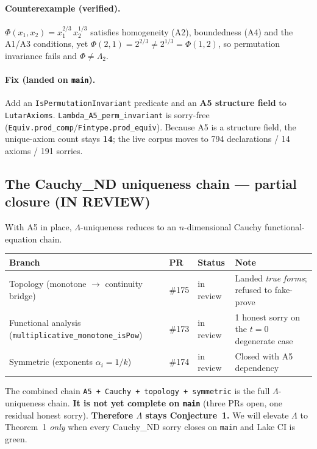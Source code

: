 \documentclass[11pt]{article}
\newcommand{\Lam}{\ensuremath{\Lambda}}
\begin{document}
\paragraph{Counterexample (verified).} $\Phi(x_1,x_2)=x_1^{2/3}\,x_2^{1/3}$ satisfies homogeneity (A2),
boundedness (A4) and the A1/A3 conditions, yet $\Phi(2,1)=2^{2/3}\neq 2^{1/3}=\Phi(1,2)$, so
permutation invariance fails and $\Phi\neq\Lambda_2$.

\paragraph{Fix (landed on \texttt{main}).} Add an \texttt{IsPermutationInvariant} predicate and an
\textbf{A5 structure field} to \texttt{LutarAxioms}. \texttt{Lambda\_A5\_perm\_invariant} is sorry-free
(\texttt{Equiv.prod\_comp}/\texttt{Fintype.prod\_equiv}). Because A5 is a structure field, the
unique-axiom count stays \textbf{14}; the live corpus moves to 794 declarations / 14 axioms / 191 sorries.

\subsection{The Cauchy\_ND uniqueness chain --- partial closure (IN REVIEW)}
With A5 in place, \Lam-uniqueness reduces to an $n$-dimensional Cauchy functional-equation chain.

\begin{center}\small
\begin{tabular}{@{}llll@{}}
\toprule
Branch & PR & Status & Note \\
\midrule
Topology (monotone $\to$ continuity bridge) & \#175 & in review & Landed \emph{true forms}; refused to fake-prove \\
Functional analysis (\texttt{multiplicative\_monotone\_isPow}) & \#173 & in review & 1 honest sorry on the $t=0$ degenerate case \\
Symmetric (exponents $\alpha_i=1/k$) & \#174 & in review & Closed with A5 dependency \\
\bottomrule
\end{tabular}
\end{center}

\noindent The combined chain \texttt{A5 + Cauchy + topology + symmetric} is the full \Lam-uniqueness
chain. \textbf{It is not yet complete on \texttt{main}} (three PRs open, one residual honest sorry).
\textbf{Therefore \Lam{} stays Conjecture~1.} We will elevate \Lam{} to Theorem~1 \emph{only} when every
Cauchy\_ND sorry closes on \texttt{main} and Lake CI is green.
\end{document}
